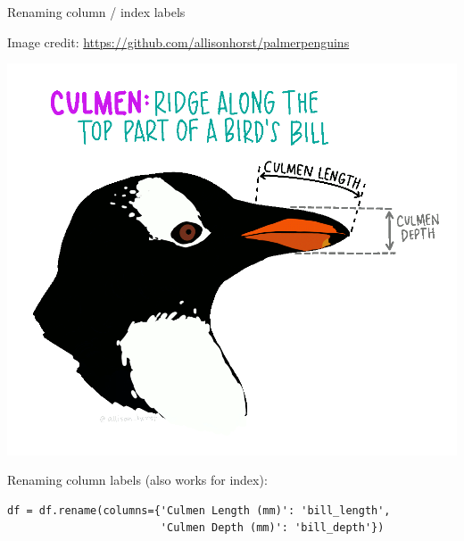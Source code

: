\documentclass[aspectratio=169,usenames,dvipsnames]{beamer}
\begin{document}

% 
% 
% 
 
\begin{frame}[fragile]{Renaming column / index labels}
\begin{reference}
Image credit: \url{https://github.com/allisonhorst/palmerpenguins}
\end{reference}
\includegraphics[height=0.5\textheight]{fig/culmen_depth}

Renaming column labels (also works for index):
\begin{lstlisting}
df = df.rename(columns={'Culmen Length (mm)': 'bill_length',
                        'Culmen Depth (mm)': 'bill_depth'})
\end{lstlisting}
\end{frame}
\end{document}
